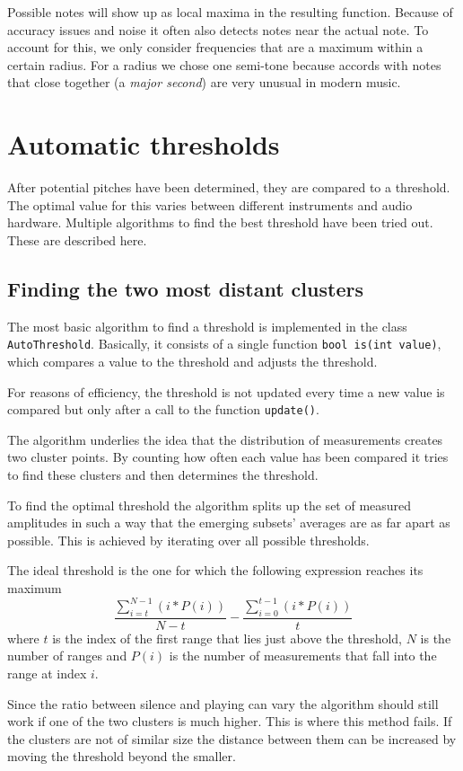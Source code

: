 Possible notes will show up as local maxima in the resulting function.
Because of accuracy issues and noise it often also detects notes near the actual note. To account for this, we only consider frequencies that are a maximum  within a certain radius. For a radius we chose one semi-tone because accords with notes that close together (a {\em major second}) are very unusual in modern music. 

\section{Automatic thresholds}
After potential pitches have been determined, they are compared to a threshold. The optimal value for this varies between different instruments and audio hardware. Multiple algorithms to find the best threshold have been tried out. These are described here.

\subsection{Finding the two most distant clusters}
The most basic algorithm to find a threshold is implemented in the class {\tt AutoThreshold}. Basically, it consists of a single function {\tt bool is(int value)}, which compares a value to the threshold and adjusts the threshold. 

For reasons of efficiency, the threshold is not updated every time a new value is compared but only after a call to the function {\tt update()}.

The algorithm underlies the idea that the distribution of measurements creates two cluster points. By counting how often each value has been compared it tries to find these clusters and then determines the threshold. 

To find the optimal threshold the algorithm splits up the set of measured amplitudes in such a way that the emerging subsets' averages are as far apart as possible. This is achieved by iterating over all possible thresholds.

The ideal threshold is the one for which the following expression reaches its maximum 
$$ \frac{\sum_{i = t}^{N - 1}(i * P(i))}{N - t} - \frac{\sum_{i = 0}^{t - 1}(i * P(i))}{t} $$
where $t$ is the index of the first range that lies just above the threshold, $N$ is the number of ranges and $P(i)$ is the number of measurements that fall into the range at index $i$.

Since the ratio between silence and playing can vary the algorithm should still work if one of the two clusters is much higher. This is where this method fails. If the clusters are not of similar size the distance between them can be increased by moving the threshold beyond the smaller.

